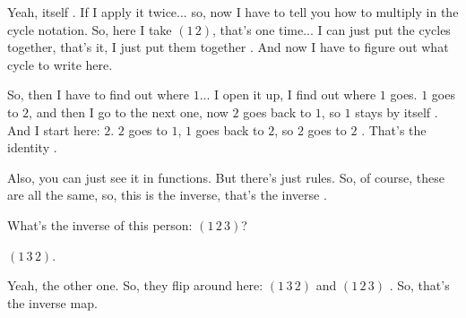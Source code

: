 \begin{speech}[01:11:32 - 01:12:15]
Yeah, itself . If I apply it twice... so, now I have to tell you how to multiply in the cycle notation. So, here I take $(1\,2)$, that's one time... I can just put the cycles together, that's it, I just put them together . And now I have to figure out what cycle to write here.

So, then I have to find out where $1$... I open it up, I find out where $1$ goes. $1$ goes to $2$, and then I go to the next one, now $2$ goes back to $1$, so $1$ stays by itself . And I start here: $2$. $2$ goes to $1$, $1$ goes back to $2$, so $2$ goes to $2$ . That's the identity .

Also, you can just see it in functions. But there's just rules. So, of course, these are all the same, so, this is the inverse, that's the inverse .

What's the inverse of this person: $(1\,2\,3)$?
\end{speech}

\begin{student}
$(1\,3\,2)$.
\end{student}

\begin{speech}[01:12:16 - 01:12:31]
Yeah, the other one. So, they flip around here: $(1\,3\,2)$ and $(1\,2\,3)$ . So, that's the inverse map.
\end{speech}

\begin{content}
\end{content}

